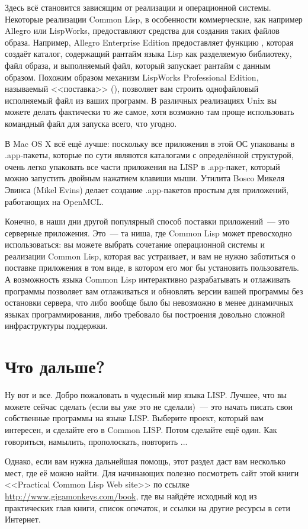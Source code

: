 Здесь всё становится зависящим от реализации и операционной системы. Некоторые реализации
Common Lisp, в особенности коммерческие, как например Allegro или LispWorks, предоставляют
средства для создания таких файлов образа. Например, Allegro Enterprise Edition
предоставляет функцию , которая создаёт каталог,
содержащий рантайм языка Lisp как разделяемую библиотеку, файл образа, и выполняемый файл,
который запускает рантайм с данным образом. Похожим образом механизм LispWorks
Professional Edition, называемый <<поставка>> (), позволяет вам строить
однофайловый исполняемый файл из ваших программ. В различных реализациях Unix вы можете
делать фактически то же самое, хотя возможно там проще использовать командный файл для
запуска всего, что угодно.

В Mac OS X всё ещё лучше: поскольку все приложения в этой ОС упакованы в .app-пакеты,
которые по сути являются каталогами с определённой структурой, очень легко упаковать все
части приложения на LISP в .app-пакет, который можно запустить двойным нажатием клавиши
мыши. Утилита Bosco Микеля Эвинса (Mikel Evins) делает создание .app-пакетов простым для
приложений, работающих на OpenMCL.

Конечно, в наши дни другой популярный способ поставки приложений~--- это серверные
приложения. Это~--- та ниша, где Common Lisp может превосходно использоваться: вы можете
выбрать сочетание операционной системы и реализации Common Lisp, которая вас устраивает, и
вам не нужно заботиться о поставке приложения в том виде, в котором его мог бы установить
пользователь. А возможность языка Common Lisp интерактивно разрабатывать и отлаживать
программы позволяет вам отлаживаться и обновлять версии вашей программы без остановки
сервера, что либо вообще было бы невозможно в менее динамичных языках программирования,
либо требовало бы построения довольно сложной инфраструктуры поддержки.

\section{Что дальше?}

Ну вот и все. Добро пожаловать в чудесный мир языка LISP. Лучшее, что вы можете сейчас
сделать (если вы уже это не сделали)~--- это начать писать свои собственные программы на
языке LISP. Выберите проект, который вам интересен, и сделайте его в Common LISP. Потом
сделайте ещё один. Как говориться, намылить, прополоскать, повторить ...

Однако, если вам нужна дальнейшая помощь, этот раздел даст вам несколько мест, где её
можно найти. Для начинающих полезно посмотреть сайт этой книги <<Practical Common Lisp Web
site>> по ссылке \url{http://www.gigamonkeys.com/book}, где вы найдёте исходный код из
практических глав книги, список опечаток, и ссылки на другие ресурсы в сети Интернет.

